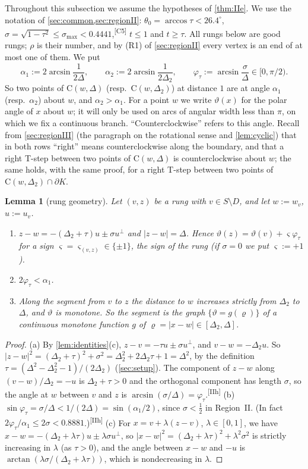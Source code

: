\documentclass[11pt]{amsart}
\newtheorem{lemma}[theorem]{Lemma}
\theoremstyle{definition}
\theoremstyle{remark}
\newcommand{\Dt}{\Delta_2}
\newcommand{\Cc}{\mathrm{C}}      %
\newcommand{\chk}[1]{\textsuperscript{[#1]}}
\begin{document}
Throughout this subsection we assume the hypotheses of \cref{thm:IIe}. We use the notation of \cref{sec:common,sec:regionII}: $\theta_0=\arccos\tau<26.4^\circ$, $\sigma=\sqrt{1-\tau^2}\le\sigma_{\max}<0.4441$,\chk{C5} $t\le1$ and $t\ge\tau$. All rungs below are good rungs; $\rho$ is their number, and by (R1) of \cref{sec:regionII} every vertex is an end of at most one of them. We put
\[
\alpha_1:=2\arcsin\frac1{2\Delta},\qquad \alpha_2:=2\arcsin\frac1{2\Dt},\qquad \varphi_\tau:=\arcsin\frac{\sigma}{\Delta}\in[0,\pi/2).
\]
So two points of $\Cc(w,\Delta)$ (resp.\ $\Cc(w,\Dt)$) at distance $1$ are at angle $\alpha_1$ (resp.\ $\alpha_2$) about $w$, and $\alpha_2>\alpha_1$. For a point $w$ we write $\vartheta(x)$ for the polar angle of $x$ about $w$; it will only be used on arcs of angular width less than $\pi$, on which we fix a continuous branch. ``Counterclockwise'' refers to this angle. Recall from \cref{sec:regionIII} (the paragraph on the rotational sense and \cref{lem:cyclic}) that in both rows ``right'' means counterclockwise along the boundary, and that a right T-step between two points of $\Cc(w,\Delta)$ is counterclockwise about $w$; the same holds, with the same proof, for a right T-step between two points of $\Cc(w,\Dt)\cap\partial K$.

\begin{lemma}[rung geometry]\label{lem:IIrung}
Let $(v,z)$ be a rung with $v\in S\setminus D$, and let $w:=w_v$, $u:=u_v$.
\begin{enumerate}[label=\textup{(\alph*)}]
\item $z-w=-(\Dt+\tau)u\pm\sigma u^\perp$ and $|z-w|=\Delta$. Hence $\vartheta(z)=\vartheta(v)+\varsigma\varphi_\tau$ for a sign $\varsigma=\varsigma_{(v,z)}\in\{\pm1\}$, the \emph{sign} of the rung \textup{(}if $\sigma=0$ we put $\varsigma:=+1$\textup{)}.
\item $2\varphi_\tau<\alpha_1$.
\item Along the segment from $v$ to $z$ the distance to $w$ increases strictly from $\Dt$ to $\Delta$, and $\vartheta$ is monotone. So the segment is the graph $\{\vartheta=g(\varrho)\}$ of a continuous monotone function $g$ of $\varrho=|x-w|\in[\Dt,\Delta]$.
\end{enumerate}
\end{lemma}
\begin{proof}
(a) By \cref{lem:identities}(c), $z-v=-\tau u\pm\sigma u^\perp$, and $v-w=-\Dt u$. So $|z-w|^2=(\Dt+\tau)^2+\sigma^2=\Dt^2+2\Dt\tau+1=\Delta^2$, by the definition $\tau=(\Delta^2-\Dt^2-1)/(2\Dt)$ (\cref{sec:setup}). The component of $z-w$ along $(v-w)/\Dt=-u$ is $\Dt+\tau>0$ and the orthogonal component has length $\sigma$, so the angle at $w$ between $v$ and $z$ is $\arcsin(\sigma/\Delta)=\varphi_\tau$.\chk{IIh}
(b) $\sin\varphi_\tau=\sigma/\Delta<1/(2\Delta)=\sin(\alpha_1/2)$, since $\sigma<\frac12$ in Region~II. (In fact $2\varphi_\tau/\alpha_1\le2\sigma<0.8881$.)\chk{IIh}
(c) For $x=v+\lambda(z-v)$, $\lambda\in[0,1]$, we have $x-w=-(\Dt+\lambda\tau)u\pm\lambda\sigma u^\perp$, so $|x-w|^2=(\Dt+\lambda\tau)^2+\lambda^2\sigma^2$ is strictly increasing in $\lambda$ (as $\tau>0$), and the angle between $x-w$ and $-u$ is $\arctan(\lambda\sigma/(\Dt+\lambda\tau))$, which is nondecreasing in $\lambda$.
\end{proof}
\end{document}
